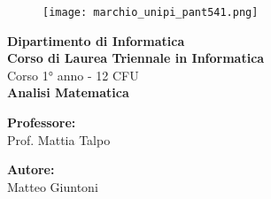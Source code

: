 \begin{titlepage} %
\begin{figure}[t] %
    \centering\texttt{[image: marchio\_unipi\_pant541.png]}
\end{figure}
\vspace{20mm}

\begin{Large}
 \begin{center}
	\textbf{Dipartimento di Informatica\\ Corso di Laurea Triennale in Informatica\\}
	\vspace{20mm}
    {\LARGE{Corso 1° anno - 12 CFU}}\\
	\vspace{10mm}
	{\huge{\bf Analisi Matematica}}\\
\end{center}
\end{Large}


\vspace{36mm}
\begin{minipage}[t]{0.47\textwidth}
	{\large{\bf Professore:}\\ \large{Prof. Mattia Talpo}}
\end{minipage}
\hfill
\begin{minipage}[t]{0.47\textwidth}\raggedleft
	{\large{\bf Autore:}\\ \large{Matteo Giuntoni}}
\end{minipage}

\vspace{25mm}

\hrulefill

\vspace{5mm}


\end{titlepage}